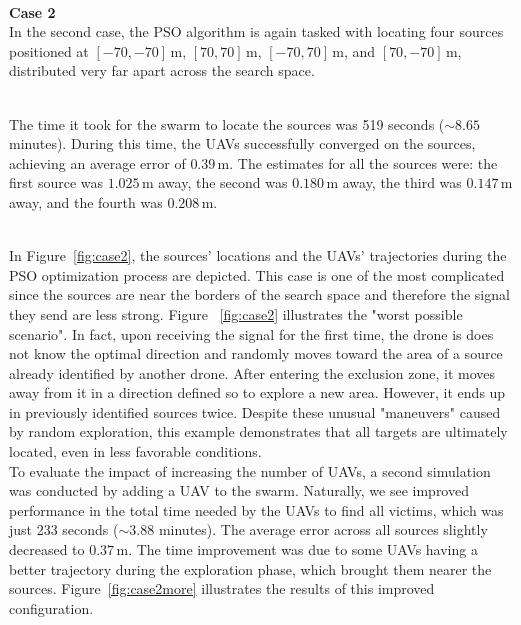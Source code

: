 \documentclass[main]{subfiles}
\begin{document}
\noindent\\
\textbf{Case 2}\\
In the second case, the PSO algorithm is again tasked with locating four 
sources positioned at \([-70, -70] \, \text{m}\), \([70, 70] \, \text{m}\), \([-70, 70] \, \text{m}\), and \([70, -70] \, \text{m}\), 
distributed very far apart across the search space.

\noindent\\
The time it took for the swarm to locate the sources was 519 seconds (\(\sim 8.65\) minutes). 
During this time, 
the UAVs successfully converged on the sources, achieving an average error of \(0.39 \, \text{m}\). 
The estimates for all the sources were: the first source was \(1.025 \, \text{m}\) away, 
the second was \(0.180 \, \text{m}\) away, the third was \(0.147 \, \text{m}\) away, 
and the fourth was \(0.208 \, \text{m}\). 

\noindent\\
In Figure~\ref{fig:case2}, the sources' locations and the UAVs' 
trajectories during the PSO optimization process are depicted. 
This case is one of the most complicated since the sources are near
the borders of the search space and therefore
the signal they send are less strong.
Figure ~\ref{fig:case2} illustrates the "worst possible scenario".
In fact, upon receiving the signal for the first time, the drone is does not know the optimal direction and 
randomly moves toward the area of a 
source already identified by another drone. 
After entering the exclusion zone, it moves away from it in a direction defined so to explore a new area. 
However, it ends up in previously identified sources twice. 
Despite these unusual "maneuvers" caused by random exploration, 
this example demonstrates that all targets are ultimately located, even in less favorable conditions.
\noindent\\
To evaluate the impact of increasing the number of UAVs, a second simulation 
was conducted by adding a UAV to the swarm. 
Naturally, we see improved performance in the total time
needed by the UAVs to find all victims, which was just 233 seconds (\(\sim 3.88\) minutes).
The average error across all sources slightly decreased to \(0.37 \, \text{m}\). 
The time improvement was due to some UAVs 
having a better trajectory during the exploration phase, which brought 
them nearer the sources.
Figure~\ref{fig:case2more} illustrates the results of this improved configuration. 
\end{document}
